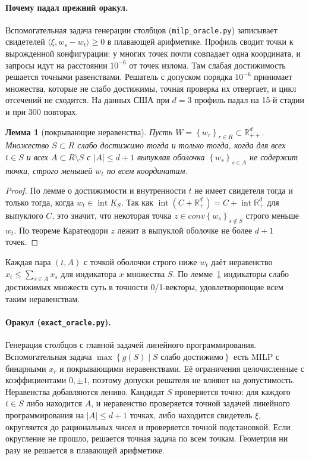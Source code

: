 \documentclass[a4paper,11pt]{article}
\theoremstyle{plain}
\newtheorem{lemma}[theorem]{Лемма}
\theoremstyle{definition}
\theoremstyle{remark}
\newcommand{\R}{\mathbb{R}}
\newcommand{\abs}[1]{\left\lvert #1 \right\rvert}
\newcommand{\set}[1]{\left\{ #1 \right\}}
\newcommand{\ip}[2]{\langle #1, #2\rangle}
\newcommand{\Rpp}[1][2]{\R^{#1}_{++}}
\newcommand{\Rp}[1][2]{\R^{#1}_{+}}
\begin{document}
\paragraph{Почему падал прежний оракул.} Вспомогательная задача генерации столбцов (\texttt{milp\_oracle.py}) записывает свидетелей $\ip{\xi}{w_s-w_t}\ge0$ в плавающей арифметике. Профиль сводит точки к вырожденной конфигурации: у многих точек почти совпадает одна координата, и запросы идут на расстоянии $10^{-6}$ от точек излома. Там слабая достижимость решается точными равенствами. Решатель с допуском порядка $10^{-6}$ принимает множества, которые не слабо достижимы, точная проверка их отвергает, и цикл отсечений не сходится. На данных США при $d=3$ профиль падал на 15-й стадии и при 300 повторах.

\begin{lemma}[покрывающие неравенства]\label{lem:cover}
    Пусть $W=\set{w_r}_{r\in R}\subset\Rpp[d]$. Множество $S\subset R$ слабо достижимо тогда и только тогда, когда для всех $t\in S$ и всех $A\subset R\setminus S$ с $\abs A\le d+1$ выпуклая оболочка $\set{w_s}_{s\in A}$ не содержит точки, строго меньшей $w_t$ по всем координатам.
\end{lemma}

\begin{proof}
    По лемме о достижимости и внутренности $t$ не имеет свидетеля тогда и только тогда, когда $w_t\in\operatorname{int} K_S$. Так как $\operatorname{int}(C+\Rp[d])=C+\operatorname{int}\Rp[d]$ для выпуклого $C$, это значит, что некоторая точка $z\in conv \set{w_s}_{s\notin S}$ строго меньше $w_t$. По теореме Каратеодори $z$ лежит в выпуклой оболочке не более $d+1$ точек.
\end{proof}

Каждая пара $(t,A)$ с точкой оболочки строго ниже $w_t$ даёт неравенство $x_t\le\sum_{s\in A}x_s$ для индикатора $x$ множества $S$. По лемме~\ref{lem:cover} индикаторы слабо достижимых множеств суть в точности 0/1-векторы, удовлетворяющие всем таким неравенствам.

\paragraph{Оракул (\texttt{exact\_oracle.py}).} Генерация столбцов с главной задачей линейного программирования. Вспомогательная задача $\max\set{g(S)\mid S\text{ слабо достижимо}}$ есть MILP с бинарными $x_r$ и покрывающими неравенствами. Её ограничения целочисленные с коэффициентами $0,\pm1$, поэтому допуски решателя не влияют на допустимость. Неравенства добавляются лениво. Кандидат $S$ проверяется точно: для каждого $t\in S$ либо находится $A$, и неравенство проверяется точной задачей линейного программирования на $\abs A\le d+1$ точках, либо находится свидетель $\xi$, округляется до рациональных чисел и проверяется точной подстановкой. Если округление не прошло, решается точная задача по всем точкам. Геометрия ни разу не решается в плавающей арифметике.
\end{document}
